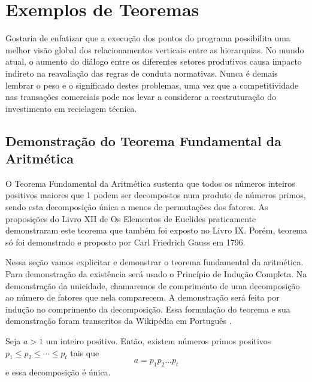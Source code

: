 \documentclass[fleqn]{icat-ufal}
\begin{document}
\chapter{Exemplos de Teoremas}
\label{cap:exemplos_de_teoremas}

Gostaria de enfatizar que a execução dos pontos do programa possibilita uma
melhor visão global dos relacionamentos verticais entre as hierarquias. No mundo
atual, o aumento do diálogo entre os diferentes setores produtivos causa impacto
indireto na reavaliação das regras de conduta normativas. Nunca é demais lembrar
o peso e o significado destes problemas, uma vez que a competitividade nas
transações comerciais pode nos levar a considerar a reestruturação do
investimento em reciclagem técnica. 

\section{Demonstração do Teorema Fundamental da Aritmética}
\label{sec:demonstracao_aritmetica}

O Teorema Fundamental da Aritmética sustenta que todos os números inteiros
positivos maiores que 1 podem ser decompostos num produto de números primos,
sendo esta decomposição única a menos de permutações dos fatores. As proposições
do Livro XII de Os Elementos de Euclides praticamente demonstraram este teorema
que também foi exposto no Livro IX. Porém, teorema só foi demonstrado e proposto
por Carl Friedrich Gauss em 1796.

Nessa seção vamos explicitar e demonstrar o teorema fundamental da aritmética.
Para demonstração da existência será usado o Princípio de Indução Completa.
Na demonstração da unicidade, chamaremos de comprimento de uma decomposição ao
número de fatores que nela comparecem. A demonstração será feita por indução no
comprimento da decomposição. Essa formulação do teorema e sua demonstração 
foram transcritos da Wikipédia em Português \cite{WIKI:TEO_FUND_ARIT}.

\begin{teorema}
    \label{teo:aritimetica}
    Seja $a>1$ um inteiro positivo. Então, existem números primos positivos
    ${ p_1 \leq p_2 \leq \cdots \leq p_t}$ tais que 
    \[ a = p_1 p_2 \dots p_t \]
    e essa decomposição é única.
\end{teorema}
\end{document}
